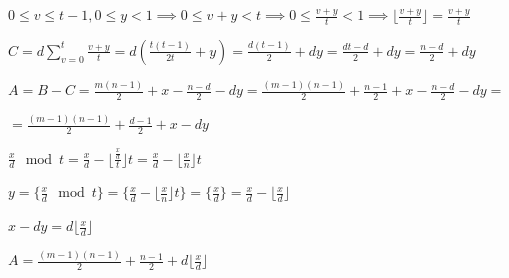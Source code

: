 \documentclass{article}
\begin{document}
$0 \leq v \leq t - 1, 0 \leq y < 1 \implies 0 \leq v + y < t \implies 0 \leq \frac{v+y}{t} < 1 \implies \lfloor \frac{v + y} {t} \rfloor = \frac{v + y}{t}$

$C = d\sum_{v=0}^t \frac{v+y}{t} = d(\frac{t(t-1)}{2t} + y) = \frac{d(t-1)}{2} + dy = \frac{dt-d}{2} + dy = \frac{n-d}{2} + dy$

$A = B - C = \frac{m(n-1)}{2} + x - \frac{n-d}{2} - dy = \frac{(m-1)(n-1)}{2} + \frac{n-1}{2} + x - \frac{n-d}{2} - dy =$

$= \frac{(m-1)(n-1)}{2} + \frac{d-1}{2} + x - dy$

$\frac{x}{d} \mod t = \frac{x}{d} - \lfloor \frac{\frac{x}{d}}{t} \rfloor t = \frac{x}{d} - \lfloor \frac{x}{n} \rfloor t$

$y = \{ \frac{x}{d} \mod t \} = \{ \frac{x}{d} - \lfloor \frac{x}{n} \rfloor t \} = \{ \frac{x}{d} \} = \frac{x}{d} - \lfloor \frac{x}{d} \rfloor$

$x - dy = d \lfloor \frac{x}{d} \rfloor$

$A = \frac{(m-1)(n-1)}{2} + \frac{n-1}{2} + d \lfloor \frac{x}{d} \rfloor$
\end{document}
